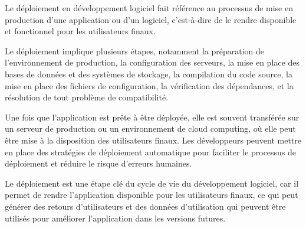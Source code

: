 Le déploiement en développement logiciel fait référence au processus de mise en production d'une application ou d'un logiciel, c'est-à-dire de le rendre disponible et fonctionnel pour les utilisateurs finaux.

Le déploiement implique plusieurs étapes, notamment la préparation de l'environnement de production, la configuration des serveurs, la mise en place des bases de données et des systèmes de stockage, la compilation du code source, la mise en place des fichiers de configuration, la vérification des dépendances, et la résolution de tout problème de compatibilité.

Une fois que l'application est prête à être déployée, elle est souvent transférée sur un serveur de production ou un environnement de cloud computing, où elle peut être mise à la disposition des utilisateurs finaux. Les développeurs peuvent mettre en place des stratégies de déploiement automatique pour faciliter le processus de déploiement et réduire le risque d'erreurs humaines.

Le déploiement est une étape clé du cycle de vie du développement logiciel, car il permet de rendre l'application disponible pour les utilisateurs finaux, ce qui peut générer des retours d'utilisateurs et des données d'utilisation qui peuvent être utilisés pour améliorer l'application dans les versions futures.